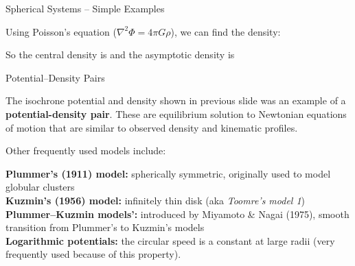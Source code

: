\documentclass[letterpaper,landscape]{slides}
\begin{document}
\begin{slide}
\begin{center}
{\large \color{red} 
                      Spherical Systems -- Simple Examples}
\end{center}


Using Poisson's equation ($\nabla^2 \Phi = 4\pi G \rho$), we can find the density:


So the central density is
and the asymptotic density is

\vfill
\end{slide}






\begin{slide}
\begin{center}
{\large \color{red} 
                         Potential--Density Pairs }
\end{center}
The isochrone potential and density shown in previous slide was an example of
a {\bf potential-density pair}. These are equilibrium solution to Newtonian 
equations of motion that are similar to observed density and kinematic
profiles.

Other frequently used models include:

{\bf Plummer's (1911) model:} spherically symmetric, originally used to model globular clusters \\
{\bf Kuzmin's (1956) model:} infinitely thin disk (aka {\it Toomre's model 1}) \\
{\bf Plummer--Kuzmin models':} introduced by Miyamoto \& Nagai (1975), smooth transition from Plummer's to Kuzmin's models \\
{\bf Logarithmic potentials:} the circular speed is a constant at large radii
(very frequently used because of this property).

\vfill
\end{slide}
\end{document}
